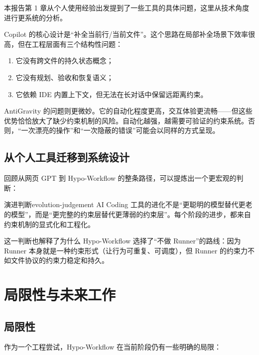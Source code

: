 \documentclass[
  outputdir=build,
  chapterstyle=cn,
  colorscheme=Simple,
  fontset=tech,
  code=false
]{Hypo-Note}
\begin{document}
本报告第 1 章从个人使用经验出发提到了一些工具的具体问题，这里从技术角度进行更系统的分析。

Copilot 的核心设计是“补全当前行/当前文件”。这个思路在局部补全场景下效率很高，但在工程层面有三个结构性问题：

\begin{enumerate}[leftmargin=2em]
  \item 它没有跨文件的持久状态概念；
  \item 它没有规划、验收和恢复语义；
  \item 它依赖 IDE 内置上下文，但无法在长对话中保留远距离约束。
\end{enumerate}

AntiGravity 的问题则更微妙。它的自动化程度更高，交互体验更流畅——但这些优势恰恰放大了缺少约束机制的风险。自动化越强，越需要可验证的约束系统。否则，“一次漂亮的操作”和“一次隐蔽的错误”可能会以同样的方式呈现。

\section{从个人工具迁移到系统设计}

回顾从网页 GPT 到 Hypo-Workflow 的整条路径，可以提炼出一个更宏观的判断：

\begin{important}{演进判断}{evolution-judgement}
AI Coding 工具的进化不是“更聪明的模型替代更老的模型”，而是“更完整的约束层替代更薄弱的约束层”。每个阶段的进步，都来自约束机制的显式化和工程化。
\end{important}

这一判断也解释了为什么 Hypo-Workflow 选择了“不做 Runner”的路线：因为 Runner 本身就是一种约束形式（让行为可重复、可调度），但 Runner 的约束力不如文件协议的约束力稳定和持久。

\chapter{局限性与未来工作}

\section{局限性}

作为一个工程尝试，Hypo-Workflow 在当前阶段仍有一些明确的局限：
\end{document}
